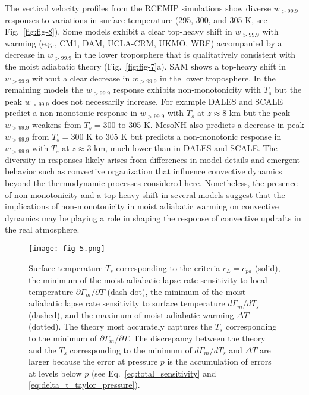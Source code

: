 \documentclass[draft]{ametsocV6.1}
\begin{document}
The vertical velocity profiles from the RCEMIP simulations show diverse $w_{>99.9}$ responses to variations in surface temperature (295, 300, and 305 K, see Fig.~\ref{fig:fig-8}). Some models exhibit a clear top-heavy shift in $w_{>99.9}$ with warming (e.g., CM1, DAM, UCLA-CRM, UKMO, WRF) accompanied by a decrease in $w_{>99.9}$ in the lower troposphere that is qualitatively consistent with the moist adiabatic theory (Fig.~\ref{fig:fig-7}a). SAM shows a top-heavy shift in $w_{>99.9}$ without a clear decrease in $w_{>99.9}$ in the lower troposphere. In the remaining models the $w_{>99.9}$ response exhibits non-monotonicity with $T_s$ but the peak $w_{>99.9}$ does not necessarily increase. For example DALES and SCALE predict a non-monotonic response in $w_{>99.9}$ with $T_s$ at $z\approx8$ km but the peak $w_{>99.9}$ weakens from $T_s=300$ to 305 K. MesoNH also predicts a decrease in peak $w_{>99.9}$ from $T_s=300$ K to 305 K but predicts a non-monotonic response in $w_{>99.9}$ with $T_s$ at $z\approx3$ km, much lower than in DALES and SCALE. The diversity in responses likely arises from differences in model details and emergent behavior such as convective organization that influence convective dynamics beyond the thermodynamic processes considered here. Nonetheless, the presence of non-monotonicity and a top-heavy shift in several models suggest that the implications of non-monotonicity in moist adiabatic warming on convective dynamics may be playing a role in shaping the response of convective updrafts in the real atmosphere.

\begin{figure}[htbp]
 \centering
 \texttt{[image: fig-5.png]}\\
 \caption{Surface temperature $T_s$ corresponding to the criteria $c_L=c_{pd}$ (solid), the minimum of the moist adiabatic lapse rate sensitivity to local temperature $\partial \Gamma_m/\partial T$ (dash dot), the minimum of the moist adiabatic lapse rate sensitivity to surface temperature $d \Gamma_m/dT_s$ (dashed), and the maximum of moist adiabatic warming $\Delta T$ (dotted). The theory most accurately captures the $T_s$ corresponding to the minimum of $\partial \Gamma_m /\partial T$. The discrepancy between the theory and the $T_s$ corresponding to the minimum of $d\Gamma_m/dT_s$ and $\Delta T$ are larger because the error at pressure $p$ is the accumulation of errors at levels below $p$ (see Eq.~\ref{eq:total_sensitivity} and \ref{eq:delta_t_taylor_pressure}).}\label{fig:fig-5}
\end{figure}
\end{document}
